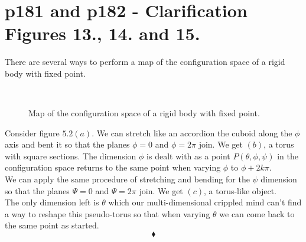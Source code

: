 \section{p181 and p182 - Clarification Figures 13., 14. and 15.}
\begin{tcolorbox}
There are several ways to perform  a map of the configuration space of a rigid body with fixed point.
\end{tcolorbox}
\begin{figure}[H]
    \centering
    \subfloat[]{}
	\
    \subfloat[]{}
    \qquad
    \subfloat[]{}
\caption{Map of the configuration space of a rigid body with fixed point.}
\label{fig:fig_p181}
\end{figure}
Consider figure $5.2 (a)$. We can stretch like an accordion the cuboid along the $\phi$ axis and bent it so that the planes $\phi=0$ and $\phi=2\pi$ join. We get $(b)$,  a torus with square sections. The dimension $\phi$ is dealt with as a point $P\left( \theta, \phi, \psi \right)$ in the configuration space  returns to the same point when varying $\phi$ to $\phi+2k\pi$.\\
We can apply the same procedure of stretching and bending for the $\psi$ dimension so that the planes $\Psi=0$ and $\Psi=2\pi$ join.
We get $(c)$,  a torus-like object.\\
The only dimension left is $\theta$ which our multi-dimensional crippled mind can't find a way to reshape this pseudo-torus so that when varying $\theta$ we can come back to the same point as started.
$$\blacklozenge$$
\newpage




